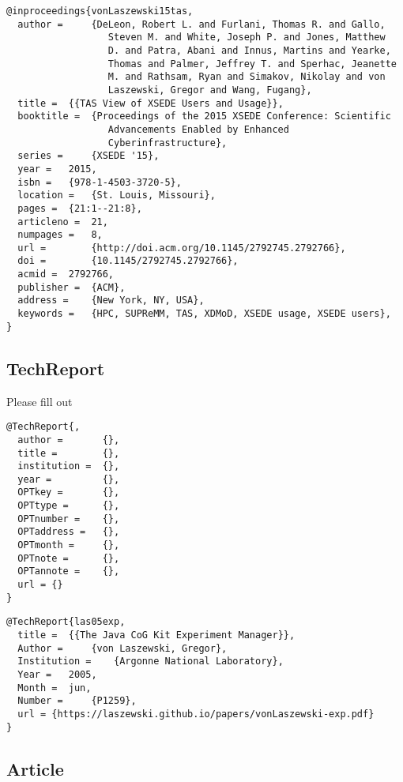 \begin{verbatim}
@inproceedings{vonLaszewski15tas,
  author =     {DeLeon, Robert L. and Furlani, Thomas R. and Gallo,
                  Steven M. and White, Joseph P. and Jones, Matthew
                  D. and Patra, Abani and Innus, Martins and Yearke,
                  Thomas and Palmer, Jeffrey T. and Sperhac, Jeanette
                  M. and Rathsam, Ryan and Simakov, Nikolay and von
                  Laszewski, Gregor and Wang, Fugang},
  title =  {{TAS View of XSEDE Users and Usage}},
  booktitle =  {Proceedings of the 2015 XSEDE Conference: Scientific
                  Advancements Enabled by Enhanced
                  Cyberinfrastructure},
  series =     {XSEDE '15},
  year =   2015,
  isbn =   {978-1-4503-3720-5},
  location =   {St. Louis, Missouri},
  pages =  {21:1--21:8},
  articleno =  21,
  numpages =   8,
  url =        {http://doi.acm.org/10.1145/2792745.2792766},
  doi =        {10.1145/2792745.2792766},
  acmid =  2792766,
  publisher =  {ACM},
  address =    {New York, NY, USA},
  keywords =   {HPC, SUPReMM, TAS, XDMoD, XSEDE usage, XSEDE users},
}
\end{verbatim}

\subsection{TechReport}\label{techreport}

Please fill out

\begin{verbatim}
@TechReport{,
  author =       {},
  title =        {},
  institution =  {},
  year =         {},
  OPTkey =       {},
  OPTtype =      {},
  OPTnumber =    {},
  OPTaddress =   {},
  OPTmonth =     {},
  OPTnote =      {},
  OPTannote =    {},
  url = {}    
}
\end{verbatim}

\begin{verbatim}
@TechReport{las05exp,
  title =  {{The Java CoG Kit Experiment Manager}},
  Author =     {von Laszewski, Gregor},
  Institution =    {Argonne National Laboratory},
  Year =   2005,
  Month =  jun,
  Number =     {P1259},
  url = {https://laszewski.github.io/papers/vonLaszewski-exp.pdf}
}
\end{verbatim}

\subsection{Article}\label{article}

